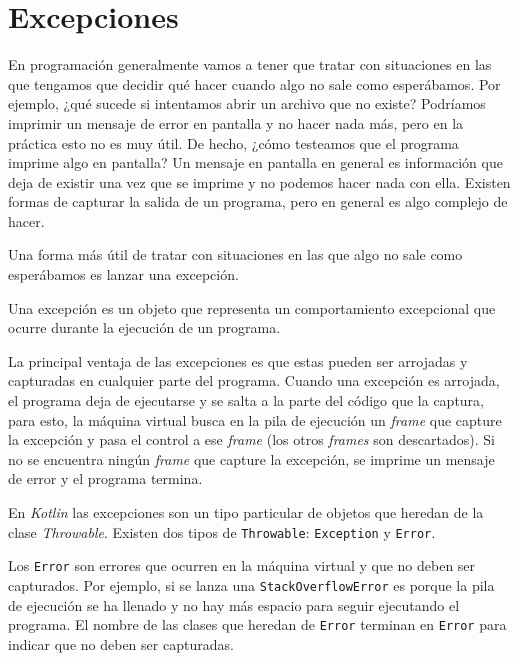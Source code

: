 \section{Excepciones}
  \label{sec:excepciones}

  En programación generalmente vamos a tener que tratar con situaciones en las que tengamos que 
  decidir qué hacer cuando algo no sale como esperábamos.
  Por ejemplo, ¿qué sucede si intentamos abrir un archivo que no existe?
  Podríamos imprimir un mensaje de error en pantalla y no hacer nada más, pero en la práctica esto
  no es muy útil.
  De hecho, ¿cómo testeamos que el programa imprime algo en pantalla?
  Un mensaje en pantalla en general es información que deja de existir una vez que se imprime
  y no podemos hacer nada con ella.
  Existen formas de capturar la salida de un programa, pero en general es algo complejo de hacer.

  Una forma más útil de tratar con situaciones en las que algo no sale como esperábamos es lanzar
  una excepción.

  \begin{defaultbox}[Excepción]
    Una excepción es un objeto que representa un comportamiento excepcional que ocurre durante la
    ejecución de un programa.
  \end{defaultbox}

  La principal ventaja de las excepciones es que estas pueden ser arrojadas y capturadas en 
  cualquier parte del programa.
  Cuando una excepción es arrojada, el programa deja de ejecutarse y se salta a la parte del
  código que la captura, para esto, la máquina virtual busca en la pila de ejecución un 
  \textit{frame} que capture la excepción y pasa el control a ese \textit{frame} (los otros 
  \textit{frames} son descartados).
  Si no se encuentra ningún \textit{frame} que capture la excepción, se imprime un mensaje de error
  y el programa termina.

  En \textit{Kotlin} las excepciones son un tipo particular de objetos que heredan de la clase
  \textit{Throwable}.
  Existen dos tipos de \texttt{Throwable}: \texttt{Exception} y \texttt{Error}.
  
  Los \texttt{Error} son errores que ocurren en la máquina virtual y que no deben ser capturados.
  Por ejemplo, si se lanza una \texttt{StackOverflowError} es porque la pila de ejecución se ha
  llenado y no hay más espacio para seguir ejecutando el programa.
  El nombre de las clases que heredan de \texttt{Error} terminan en \texttt{Error} para indicar
  que no deben ser capturadas.

